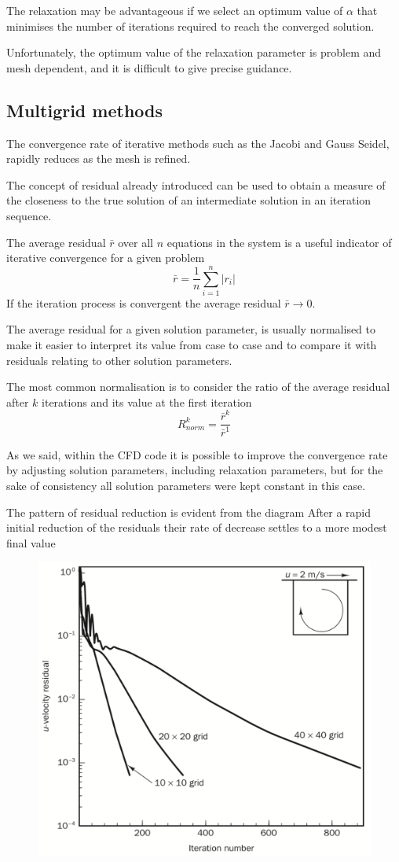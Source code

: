 \documentclass[a4paper, 15pt]{article}
\begin{document}
The
relaxation may be advantageous if we select an optimum value of $\alpha$ that minimises the
number of iterations required to reach the converged solution. 

Unfortunately,
the optimum value of the relaxation parameter is problem and mesh dependent,
and it is difficult to give precise guidance. 



\subsection{Multigrid methods} 
The
convergence rate of iterative methods such as the Jacobi and Gauss Seidel, rapidly reduces
as the mesh is refined. \newline 

The
concept of residual already introduced can be used to obtain a measure of the closeness to
the true solution of an intermediate solution in an iteration sequence. \newline 

The
average residual  $\bar{r}$ over all $n$ equations in the system is a useful indicator of iterative
convergence for a given problem
\[\bar{r} = \dfrac{1}{n}\sum_{i=1}^{n}|r_i|\]
If
the iteration process is convergent the average residual $\bar{r}\rightarrow0$. \newline 

The
average residual for a given solution parameter, is usually
normalised to make it easier to interpret its value from case to case and to compare it with
residuals relating to other solution parameters. 

The
most common normalisation is to consider the ratio of the average residual after $k$ iterations
and its value at the first iteration
\[R_{norm}^k = \dfrac{\bar{r}^k}{\bar{r}^1}\]

As
we said, within the CFD code it is possible to improve the
convergence rate by adjusting solution parameters, including
relaxation parameters, but for the sake of consistency all solution
parameters were kept constant in this case. \newline 

The
pattern of residual reduction is evident from the diagram
After a rapid initial reduction of the residuals their rate of decrease
settles to a more modest final value

\begin{figure}[H]
	\centering
	\includegraphics[width=0.5\linewidth]{fig/screenshot025}
	\label{fig:screenshot025}
\end{figure}
\end{document}
